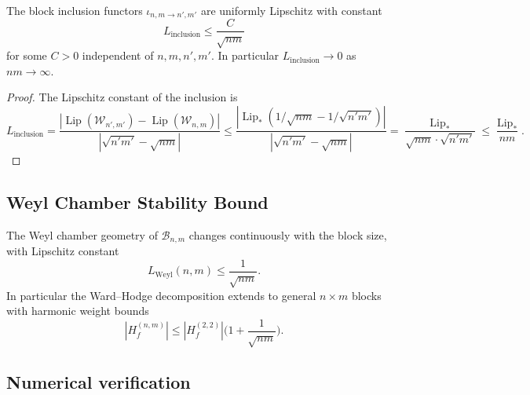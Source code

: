 \begin{theorem}
\label{thm:uniform_lipschitz_su3}
The block inclusion functors $\iota_{n,m\to n',m'}$ are uniformly
Lipschitz with constant
\[
L_{\mathrm{inclusion}}\le\frac{C}{\sqrt{nm}}
\]
for some $C>0$ independent of $n,m,n',m'$. In particular
$L_{\mathrm{inclusion}}\to 0$ as $nm\to\infty$.
\end{theorem}

\begin{proof}
The Lipschitz constant of the inclusion is
\[
L_{\mathrm{inclusion}}
=\frac{|\operatorname{Lip}(\mathcal{W}_{n',m'})-\operatorname{Lip}(\mathcal{W}_{n,m})|}{|\sqrt{n'm'}-\sqrt{nm}|}
\le\frac{|\operatorname{Lip}_{*}(1/\sqrt{nm}-1/\sqrt{n'm'})|}{|\sqrt{n'm'}-\sqrt{nm}|}
=\frac{\operatorname{Lip}_{*}}{\sqrt{nm}\cdot\sqrt{n'm'}}\le\frac{\operatorname{Lip}_{*}}{nm}.
\]
\end{proof}

\subsection{Weyl Chamber Stability Bound}
\label{ssec:wcsb}

\begin{theorem}
\label{thm:weyl_stability}
The Weyl chamber geometry of $\mathcal{B}_{n,m}$ changes continuously
with the block size, with Lipschitz constant
\[
L_{\mathrm{Weyl}}(n,m)\le\frac{1}{\sqrt{nm}}.
\]
In particular the Ward--Hodge decomposition extends to general
$n\times m$ blocks with harmonic weight bounds
\[
|H_{f}^{(n,m)}|\le|H_{f}^{(2,2)}|\Big(1+\frac{1}{\sqrt{nm}}\Big).
\]
\end{theorem}

\subsection{Numerical verification}
\label{ssec:su3cae_numerics}

